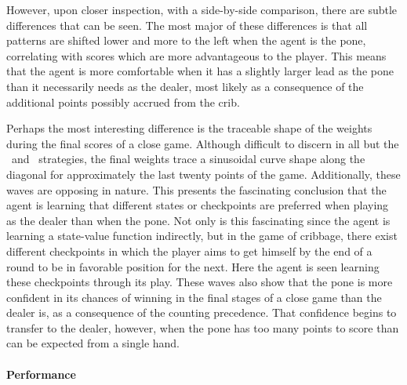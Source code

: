 However,
upon closer inspection,
with a side-by-side comparison,
there are subtle differences that can be seen.
%
The most major of these differences is that all patterns are shifted lower and
more to the left when the agent is the pone,
correlating with scores which are more advantageous to the player.
%
This means that the agent is more comfortable when it has a slightly larger
lead as the pone than it necessarily needs as the dealer,
most likely as a consequence of the
additional points possibly accrued from the crib.



Perhaps the most interesting difference is the traceable shape of the weights
during the final scores of a close game.
%
Although difficult to discern in all but the \handmaxmin\ and \handmaxavg\ 
strategies,
the final weights trace a sinusoidal curve shape along the diagonal
for approximately the last twenty points of the game.
%
Additionally,
these waves are opposing in nature.
%
This presents the fascinating conclusion that the agent is learning
that different states or checkpoints are preferred when playing as
the dealer than when the pone.
%
Not only is this fascinating since the agent is learning a state-value function
indirectly,
but in the game of cribbage,
there exist different checkpoints in which the player aims to get
himself by the end of a round to be in favorable position for the next.
%
Here the agent is seen learning these checkpoints through its play.
%
These waves also show that the pone is more confident in its chances
of winning in the final stages of a close game than the dealer is,
as a consequence of the counting precedence.
%
That confidence begins to transfer to the dealer, however,
when the pone has too many points to score
than can be expected from a single hand.


\paragraph*{Performance}

